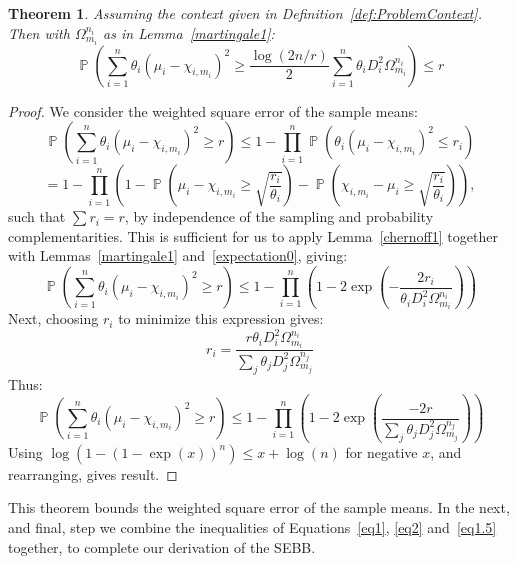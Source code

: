 \documentclass[]{interact}
\DeclareMathOperator{\pr}{\mathbb{P}}
\theoremstyle{plain}%
\newtheorem{Theorem}{Theorem}[section]
\theoremstyle{definition}
\theoremstyle{remark}
\begin{document}
\begin{Theorem}\label{thm:3}
Assuming the context given in Definition~\ref{def:ProblemContext}.
Then with $\Omega_{m_i}^{n_i}$ as in Lemma~\ref{martingale1}:
\begin{equation}\label{eq1.5} \pr\left(\sum_{i=1}^n\theta_i(\mu_i - \chi_{i,m_i})^2 \ge \frac{\log(2n/r)}{2}\sum_{i=1}^n\theta_iD_i^2\Omega_{m_i}^{n_i}\right) \le r \end{equation}
\end{Theorem}
\begin{proof}
We consider the weighted square error of the sample means:
$$ \pr\left(\sum_{i=1}^n\theta_i(\mu_i - \chi_{i,m_i})^2 \ge r\right) \le 1-\prod_{i=1}^n\pr\left(\theta_i(\mu_i - \chi_{i,m_i})^2 \le r_i\right) $$
$$= 1-\prod_{i=1}^n\left(1-\pr\left(\mu_i - \chi_{i,m_i} \ge \sqrt{\frac{r_i}{\theta_i}}\right) - \pr\left( \chi_{i,m_i}-\mu_i \ge \sqrt{\frac{r_i}{\theta_i}}\right)\right),$$
such that $\sum r_i=r$, by independence of the sampling and probability complementarities.
This is sufficient for us to apply Lemma~\ref{chernoff1} together with Lemmas~\ref{martingale1} and~\ref{expectation0}, giving:
$$ 
\pr\left(\sum_{i=1}^n\theta_i(\mu_i - \chi_{i,m_i})^2 \ge r\right) \le 1-\prod_{i=1}^n\left(1-2\exp\left(-\frac{2r_i}{\theta_iD_i^2\Omega_{m_i}^{n_i}}\right)\right)
$$
Next, choosing $r_i$ to minimize this expression gives:
$$
r_i = \frac{r\theta_iD_i^2\Omega_{m_i}^{n_i}}{\sum_j \theta_jD_j^2\Omega_{m_j}^{n_j}}
$$
Thus:
$$ 
\pr\left(\sum_{i=1}^n\theta_i(\mu_i - \chi_{i,m_i})^2 \ge r\right) \le 1-\prod_{i=1}^n\left(1-2\exp\left( \frac{-2r}{\sum_j\theta_j D_j^2\Omega_{m_j}^{n_j}}\right)\right)
$$
Using $\log(1-(1-\exp(x))^n)\le x+\log(n)$ for negative $x$, and rearranging, gives result.
\end{proof}

This theorem bounds the weighted square error of the sample means.
In the next, and final, step we combine the inequalities of Equations~\eqref{eq1}, \eqref{eq2} and~\eqref{eq1.5} together, to complete our derivation of the SEBB.
\end{document}
